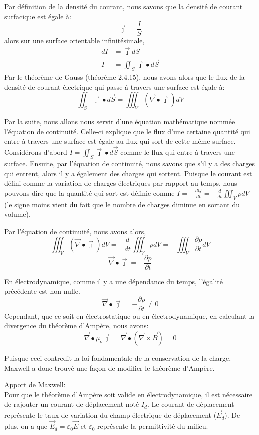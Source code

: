 \documentclass[12pt]{article}
\begin{document}
\noindent Par définition de la densité du courant, nous savons que la densité de courant surfacique est égale à:
$$\vec{\jmath}=\frac{I}{S}$$
\noindent alors sur une surface orientable infinitésimale,
\begin{align*}
dI&=\vec{\jmath}dS
\\I&=\iint_S \vec{\jmath} \bullet d\vec{S}
\end{align*}
\noindent Par le théorème de Gauss (théorème 2.4.15), nous avons alors que le flux de la densité de courant électrique qui passe à travers une surface est égale à:
$$\iint_S \vec{\jmath} \bullet d\vec{S}=\iiint_V (\vec{\nabla}\bullet\vec{\jmath})dV$$

\noindent Par la suite, nous allons nous servir d'une équation mathématique nommée l'équation de continuité. Celle-ci explique que le flux d'une certaine quantité qui entre à travers une surface est égale au flux qui sort de cette même surface. Considérons d'abord $I=\iint_S \vec{\jmath} \bullet d\vec{S}$ comme le flux qui entre à travers une surface. Ensuite, par l'équation de continuité, nous savons que s'il y a des charges qui entrent, alors il y a également des charges qui sortent. Puisque le courant est défini comme la variation de charges électriques par rapport au temps, nous pouvons dire que la quantité qui sort est définie comme $I=-\frac{dQ}{dt}=-\frac{d}{dt}\iiint_V \rho dV$ (le signe moins vient du fait que le nombre de charges diminue en sortant du volume). 

\noindent Par l'équation de continuité, nous avons alors,
$$\iiint_V(\vec{\nabla}\bullet\vec{\jmath}) dV = -\frac{d}{dt}\iiint_V \rho dV = -\iiint_V \frac{\partial p}{\partial t} dV$$
$$\vec{\nabla} \bullet \vec{\jmath} = -\frac{\partial p}{\partial t}$$

\noindent En électrodynamique, comme il y a une dépendance du temps, l'égalité précédente est non nulle. $$\vec{\nabla} \bullet \vec{\jmath} = -\frac{\partial \rho}{\partial t} \ne 0$$ Cependant, que ce soit en électrostatique ou en électrodynamique, en calculant la divergence du théorème d'Ampère, nous avons: $$\vec{\nabla} \bullet \mu_o\vec{\jmath}=\vec{\nabla} \bullet (\vec{\nabla} \times \vec{B}) = 0$$

\noindent Puisque ceci contredit la loi fondamentale de la conservation de la charge, Maxwell a donc trouvé une façon de modifier le théorème d'Ampère.

\noindent\underline{Apport de Maxwell:}
\\Pour que le théorème d'Ampère soit valide en électrodynamique, il est nécessaire de rajouter un courant de déplacement noté $I_d$. Le courant de déplacement représente le taux de variation du champ électrique de déplacement ($\vec{E}_d$). De plus, on a que $\vec{E}_d = \varepsilon_0 \vec{E}$ et $\varepsilon_0$ représente la permittivité du milieu. 
\end{document}
